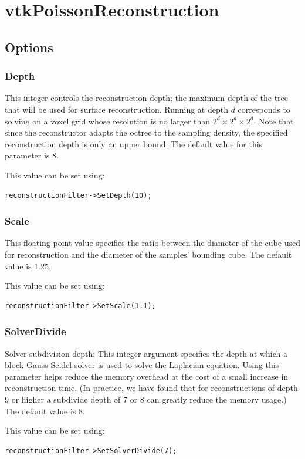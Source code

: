 \documentclass{InsightArticle}
\begin{document}
\section{vtkPoissonReconstruction}

\subsection{Options}
\subsubsection{Depth}
This integer controls the reconstruction depth; the maximum depth of the tree that will be used for surface reconstruction. Running at depth $d$ corresponds to solving on a voxel grid whose resolution is no larger than $2^d \times 2^d \times 2^d$. Note that since the reconstructor adapts the octree to the sampling density, the specified reconstruction depth is only an upper bound. The default value for this parameter is 8.

This value can be set using:
\begin{verbatim}
reconstructionFilter->SetDepth(10);
\end{verbatim}

\subsubsection{Scale}
This floating point value specifies the ratio between the diameter of the cube used for reconstruction and the diameter of the samples' bounding cube.
The default value is 1.25.

This value can be set using:
\begin{verbatim}
reconstructionFilter->SetScale(1.1); 
\end{verbatim}

\subsubsection{SolverDivide}
Solver subdivision depth; This integer argument specifies the depth at which a block Gauss-Seidel solver is used to solve the Laplacian equation. Using this parameter helps reduce the memory overhead at the cost of a small increase in reconstruction time. (In practice, we have found that for reconstructions of depth 9 or higher a subdivide depth of 7 or 8 can greatly reduce the memory usage.) The default value is 8.

This value can be set using:
\begin{verbatim}
reconstructionFilter->SetSolverDivide(7); 
\end{verbatim}
\end{document}
